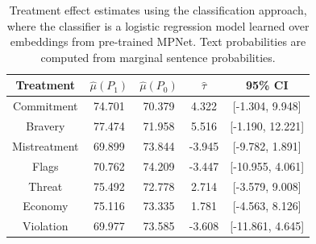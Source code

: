\documentclass{article}
\newcommand{\vl}[1]{\textcolor{orange}{[VL: #1]}}
\begin{document}
\begin{table}[!ht]
    \centering
    \begin{tabular}{c|cccc}
        \toprule
        Treatment & $\hat{\mu}(P_1)$ & $\hat{\mu}(P_0)$ & $\hat{\tau}$ & 95\% CI \\
        \midrule
        Commitment & 74.701 & 70.379 & \textcolor{green!50!black}{4.322} & [-1.304, 9.948] \\
        Bravery & 77.474 & 71.958 & \textcolor{green!50!black}{5.516} & [-1.190, 12.221] \\
        Mistreatment & 69.899 & 73.844 & \textcolor{red!80!black}{-3.945} & [-9.782, 1.891] \\
        Flags & 70.762 & 74.209 & \textcolor{red!80!black}{-3.447} & [-10.955, 4.061] \\
        Threat & 75.492 & 72.778 & \textcolor{green!50!black}{2.714} & [-3.579, 9.008] \\
        Economy & 75.116 & 73.335 & \textcolor{green!50!black}{1.781} & [-4.563, 8.126] \\
        Violation & 69.977 & 73.585 & \textcolor{red!80!black}{-3.608} & [-11.861, 4.645] \\
        \bottomrule
    \end{tabular}
    \caption{Treatment effect estimates using the classification approach, where the classifier is a logistic regression model learned over embeddings from pre-trained MPNet. Text probabilities are computed from marginal sentence probabilities.}
    \label{tab:results_clf_mpnet_marginal}
\end{table}


\end{document}

